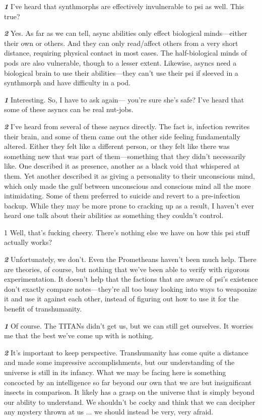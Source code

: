 \textbf{\textit{1}} I’ve heard that synthmorphs are effectively
invulnerable to psi as well. This
true?

\textbf{\textit{2}} Yes. As far as we can tell, async
abilities only effect biological
minds—either their own or others.
And they can only read/affect others
from a very short distance, requiring
physical contact in most cases. The
half-biological minds of pods are also
vulnerable, though to a lesser extent.
Likewise, asyncs need a biological
brain to use their abilities—they
can’t use their psi if sleeved in a synthmorph
and have difficulty in a pod.

\textbf{\textit{1}} Interesting. So, I have to ask again—
you’re sure she’s safe? I’ve heard
that some of these asyncs can be real
nut-jobs.

\textbf{\textit{2}} I’ve heard from several of these
asyncs directly. The fact is, infection
rewrites their brain, and some of
them came out the other side feeling
fundamentally altered. Either they
felt like a different person, or they
felt like there was something new
that was part of them—something
that they didn’t necessarily like. One
described it as presence, another as
a black void that whispered at them.
Yet another described it as giving a
personality to their unconscious mind,
which only made the gulf between
unconscious and conscious mind all
the more intimidating. Some of them
preferred to suicide and revert to a
pre-infection backup. While they may
be more prone to cracking up as a
result, I haven’t ever heard one talk
about their abilities as something
they couldn’t control.

1 Well, that’s fucking cheery. There’s
nothing else we have on how this psi
stuff actually works?

\textbf{\textit{2}} Unfortunately, we don’t. Even the
Prometheans haven’t been much
help. There are theories, of course, but
nothing that we’ve been able to verify
with rigorous experimentation. It
doesn’t help that the factions that are
aware of psi’s existence don’t exactly
compare notes—they’re all too busy
looking into ways to weaponize it
and use it against each other, instead
of figuring out how to use it for the
benefit of transhumanity.

\textbf{\textit{1}} Of course. The TITANs didn’t get us,
but we can still get ourselves. It worries
me that the best we’ve come up
with is nothing.

\textbf{\textit{2}} It’s important to keep perspective.
Transhumanity has come quite a
distance and made some impressive
accomplishments, but our understanding
of the universe is still in its infancy.
What we may be facing here is something
concocted by an intelligence so
far beyond our own that we are but
insignificant insects in comparison.
It likely has a grasp on the universe
that is simply beyond our ability to
understand. We shouldn’t be cocky
and think that we can decipher any
mystery thrown at us ... we should
instead be very, very afraid.

